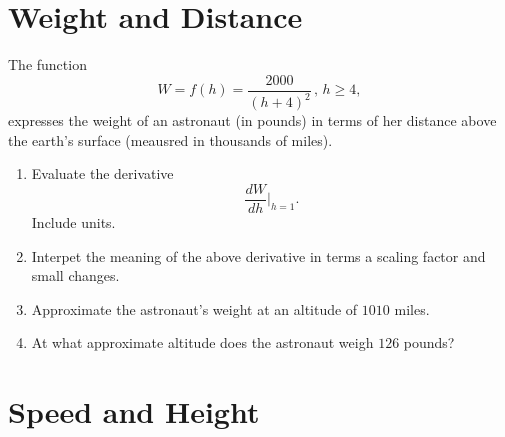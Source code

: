 \documentclass{ximera}
\begin{document}
\section{Weight and Distance}
\begin{example} \label{E8dfRPEFe}
The function 
\[
        W = f(h) = \frac{2000}{(h+4)^2} \, , \, h \geq 4,
\]
expresses the weight of an astronaut (in pounds) in terms of her distance above the earth's surface (meausred in thousands of miles).

\begin{enumerate}
\item Evaluate the derivative
\[
   \frac{dW}{dh}\Big|_{h=1}.
\]
Include units.

\item Interpet the meaning of the above derivative in terms a scaling factor and small changes.

\item Approximate the astronaut's weight at an altitude of $1010$ miles.

\item At what approximate altitude does the astronaut weigh $126$ pounds?

\end{enumerate}
\end{example}


\section{Speed and Height}
\end{document}
